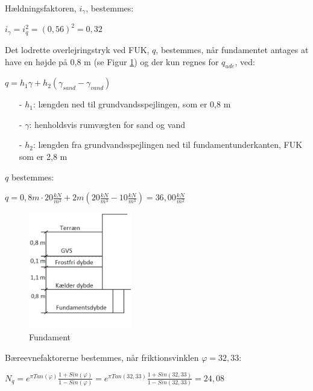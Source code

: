 Hældningsfaktoren, $i_{\gamma}$, bestemmes:
\begin{center}
	$i_{\gamma} = i_q^2 = (0,\!56)^2 = 0,\!32$
\end{center}

Det lodrette overlejringstryk ved FUK, $q$, bestemmes, når fundamentet antages at have en højde på 0,8 m (se Figur \ref{fig:hihi}) og der kun regnes for $q_{ude}$, ved:
\begin{center}
	$q = h_1 \gamma + h_2 (\gamma_{sand} - \gamma_{vand})$
\end{center}

\begin{itemize}
	\item[-] $h_1$: længden ned til grundvandsspejlingen, som er 0,8 m
	\item[-] $\gamma$: henholdsvis rumvægten for sand og vand
	\item[-] $h_2$: længden fra grundvandsspejlingen ned til fundamentunderkanten, FUK som er 2,8 m
\end{itemize}

$q$ bestemmes:
\begin{center}
	$q = 0,\!8 m \cdot 20\frac{kN}{m^3} + 2 m (20\frac{kN}{m^3} - 10\frac{kN}{m^3}) = 36,\!00 \frac{kN}{m^2}$
\end{center}

\begin{figure}[htbp]
	\centering
	\includegraphics[width=0.4\textwidth]{billeder/fundamentsdybde.png}
	\caption{Fundament}
	\label{fig:hihi}
\end{figure}

Bæreevnefaktorerne bestemmes, når friktionsvinklen $\varphi = 32,\!33$:
\begin{center}
	$N_q = e^{\pi Tan(\varphi)} \frac{1 + Sin(\varphi)}{1 - Sin(\varphi)} = e^{\pi Tan(32,\!33)} \frac{1 + Sin(32,\!33)}{1 - Sin(32,\!33)} = 24,\!08$
\end{center}

